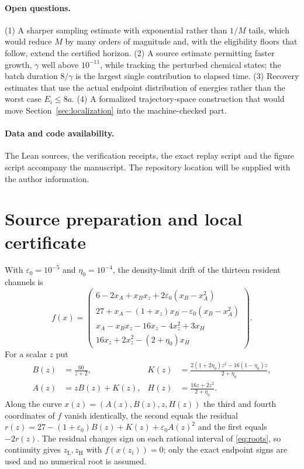 \documentclass[11pt,a4paper]{article}
\newcommand{\RepositoryNote}{The repository location will be supplied with the author information.}
\theoremstyle{plain}
\theoremstyle{definition}
\theoremstyle{remark}
\newcommand{\eps}{\varepsilon}
\newcommand{\Hs}{H}
\newcommand{\lo}{\mathrm L}
\newcommand{\hi}{\mathrm H}
\begin{document}
\paragraph{Open questions.}
(1) A sharper sampling estimate with exponential rather than $1/M$ tails, which would reduce $M$ by many orders of magnitude and, with the eligibility floors that follow, extend the certified horizon. (2) A source estimate permitting faster growth, $\gamma$ well above $10^{-11}$, while tracking the perturbed chemical states; the batch duration $8/\gamma$ is the largest single contribution to elapsed time. (3) Recovery estimates that use the actual endpoint distribution of energies rather than the worst case $E_i\le8a$. (4) A formalized trajectory-space construction that would move Section~\ref{sec:localization} into the machine-checked part.

\paragraph{Data and code availability.}
The Lean sources, the verification receipts, the exact replay script and the figure script accompany the manuscript. \RepositoryNote

\appendix

\section{Source preparation and local certificate}\label{app:source}
With $\eps_0=10^{-5}$ and $\eta_0=10^{-4}$, the density-limit drift of the thirteen resident channels is
\begin{equation}\label{eq:drift}
f(x)=\begin{pmatrix}
6-2x_A+x_Bx_z+2\eps_0(x_B-x_A^2)\\
27+x_A-(1+x_z)x_B-\eps_0(x_B-x_A^2)\\
x_A-x_Bx_z-16x_z-4x_z^2+3x_\Hs\\
16x_z+2x_z^2-(2+\eta_0)x_\Hs
\end{pmatrix}.
\end{equation}
For a scalar $z$ put
\begin{align*}
B(z)&=\frac{60}{z+2},& K(z)&=\frac{2(1+2\eta_0)z^2-16(1-\eta_0)z}{2+\eta_0},\\
A(z)&=zB(z)+K(z),& H(z)&=\frac{16z+2z^2}{2+\eta_0}.
\end{align*}
Along the curve $x(z)=(A(z),B(z),z,H(z))$ the third and fourth coordinates of $f$ vanish identically, the second equals the residual $r(z)=27-(1+\eps_0)B(z)+K(z)+\eps_0A(z)^2$ and the first equals $-2r(z)$. The residual changes sign on each rational interval of \eqref{eq:roots}, so continuity gives $z_\lo,z_\hi$ with $f(x(z_i))=0$; only the exact endpoint signs are used and no numerical root is assumed.
\end{document}
